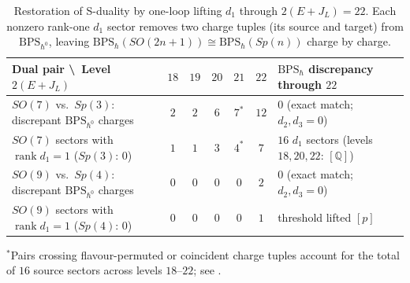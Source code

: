 \documentclass[11pt]{article}
\numberwithin{equation}{section}
\numberwithin{figure}{section}
\numberwithin{table}{section}
\begin{document}
\begin{table}[ht!]
\centering
\footnotesize\renewcommand{\arraystretch}{1.25}\setlength{\tabcolsep}{4.2pt}
\caption{Restoration of S-duality by one-loop lifting $d_1$ through $2(E+J_L)=22$. Each nonzero rank-one $d_1$ sector removes two charge tuples (its source and target) from $\mathrm{BPS}_{\hbar^0}$, leaving $\mathrm{BPS}_{\hbar}(SO(2n+1))\cong\mathrm{BPS}_{\hbar}(Sp(n))$ charge by charge.}\label{tab-sosp-sduality}
\begin{tabular}{|l|c|c|c|c|c||l|}
\hline
Dual pair \textbackslash\ Level $2(E+J_L)$ & $18$ & $19$ & $20$ & $21$ & $22$ & $\mathrm{BPS}_{\hbar}$ discrepancy through $22$\\
\hline
$SO(7)$ vs.\ $Sp(3)$: discrepant $\mathrm{BPS}_{\hbar^0}$ charges & $2$ & $2$ & $6$ & $7^\ast$ & $12$ & $0$ (exact match; $d_2,d_3=0$)\\
$SO(7)$ sectors with $\operatorname{rank}d_1=1$ ($Sp(3)$: $0$) & $1$ & $1$ & $3$ & $4^\ast$ & $7$ & $16$ $d_1$ sectors (levels $18,20,22$: $[\mathbb Q]$)\\
\hline
$SO(9)$ vs.\ $Sp(4)$: discrepant $\mathrm{BPS}_{\hbar^0}$ charges & $0$ & $0$ & $0$ & $0$ & $2$ & $0$ (exact match; $d_2,d_3=0$)\\
$SO(9)$ sectors with $\operatorname{rank}d_1=1$ ($Sp(4)$: $0$) & $0$ & $0$ & $0$ & $0$ & $1$ & threshold lifted $[p]$\\
\hline
\end{tabular}

\smallskip
{\footnotesize$^\ast$Pairs crossing flavour-permuted or coincident charge tuples account for the total of $16$ source sectors across levels $18$--$22$; see \cite[supplement, Section S3.3]{Repo}.}
\end{table}
\end{document}
